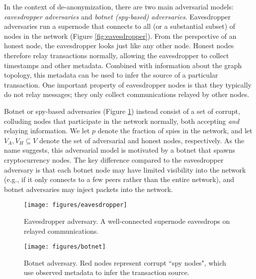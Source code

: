 \documentclass{article}
\begin{document}

In the context of de-anonymization, there are two main adversarial models: \emph{eavesdropper adversaries} and \emph{botnet (spy-based) adversaries}. Eavesdropper adversaries run a supernode that connects to all (or a substantial subset) of nodes in the network (Figure \ref{fig:eavesdropper}).
 From the perspective of an honest node, the eavesdropper looks just like any other node. Honest nodes therefore relay transactions normally, allowing the eavesdropper to collect timestamps and other metadata. Combined with information about the graph topology, this metadata can be used to infer the source of a particular transaction. One important property of eavesdropper nodes is that they typically do not relay messages; they only collect communications relayed by other nodes. 

Botnet or spy-based adversaries (Figure \ref{fig:botnet}) 
 instead consist of a set of corrupt, colluding nodes that participate in the network normally, both accepting \emph{and} relaying information. We let $p$ denote the fraction of spies in the network, and let $V_A, V_H \subseteq V$ denote the set of adversarial and honest nodes, respectively. As the name suggests, this adversarial model is motivated by a botnet that spawns cryptocurrency nodes. The key difference compared to the eavesdropper adversary is that each botnet node may have limited visibility into the network (e.g., if it only connects to a few peers rather than the entire network), and botnet adversaries may inject packets into the network. 

\begin{figure}
\begin{minipage}{0.5\textwidth}
\centering
    \texttt{[image: figures/eavesdropper]}
    \caption{Eavesdropper adversary. A well-connected supernode eavesdrops on relayed communications.}
    \label{fig:eavesdropper}
\end{minipage}
\hspace{0.1in}
\begin{minipage}{0.5\textwidth}
    \centering
    \texttt{[image: figures/botnet]}
    \caption{Botnet adversary. Red nodes represent  corrupt ``spy nodes", which use observed metadata to infer the transaction source.}
    \label{fig:botnet}
\end{minipage}
\end{figure}
\end{document}
